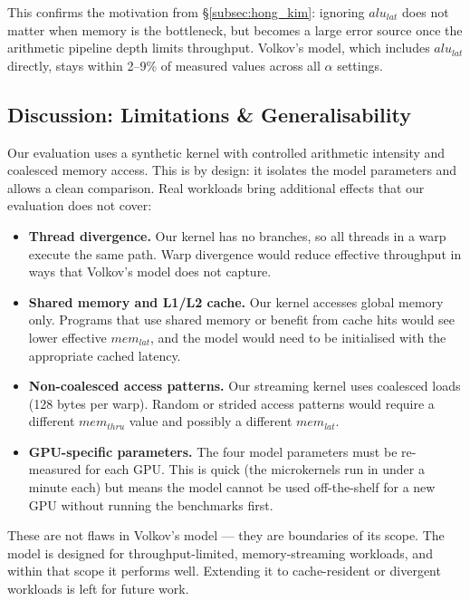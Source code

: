 This confirms the motivation from \S\ref{subsec:hong_kim}: ignoring
$alu_{lat}$ does not matter when memory is the bottleneck, but becomes a
large error source once the arithmetic pipeline depth limits throughput.
Volkov's model, which includes $alu_{lat}$ directly, stays within 2--9\% of
measured values across all $\alpha$ settings.



\subsection{Discussion: Limitations \& Generalisability}
\label{subsec:limitations}

Our evaluation uses a synthetic kernel with controlled arithmetic intensity
and coalesced memory access.
This is by design: it isolates the model parameters and allows a clean
comparison.
Real workloads bring additional effects that our evaluation does not cover:

\begin{itemize}
  \item \textbf{Thread divergence.}
    Our kernel has no branches, so all threads in a warp execute the same path.
    Warp divergence would reduce effective throughput in ways that Volkov's
    model does not capture.

  \item \textbf{Shared memory and L1/L2 cache.}
    Our kernel accesses global memory only.
    Programs that use shared memory or benefit from cache hits would see
    lower effective $mem_{lat}$, and the model would need to be initialised
    with the appropriate cached latency.

  \item \textbf{Non-coalesced access patterns.}
    Our streaming kernel uses coalesced loads (128 bytes per warp).
    Random or strided access patterns would require a different $mem_{thru}$
    value and possibly a different $mem_{lat}$.

  \item \textbf{GPU-specific parameters.}
    The four model parameters must be re-measured for each GPU.
    This is quick (the microkernels run in under a minute each) but means
    the model cannot be used off-the-shelf for a new GPU without running
    the benchmarks first.
\end{itemize}

These are not flaws in Volkov's model --- they are boundaries of its scope.
The model is designed for throughput-limited, memory-streaming workloads,
and within that scope it performs well.
Extending it to cache-resident or divergent workloads is left for future work.
